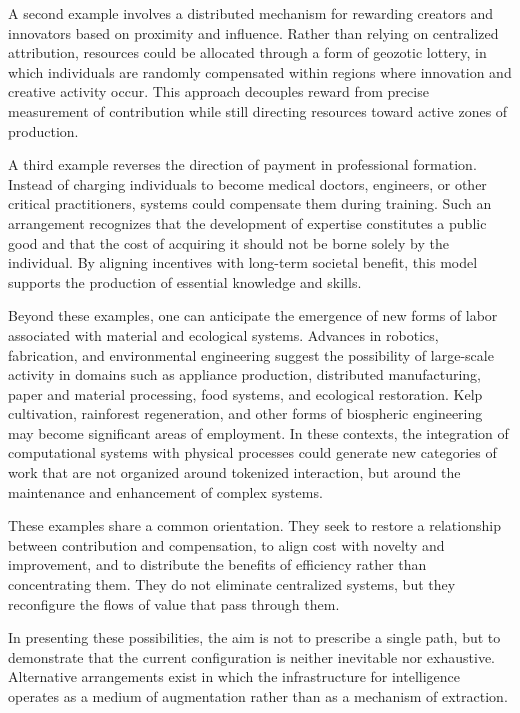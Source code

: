 \documentclass[12pt, oneside]{article}
\begin{document}
A second example involves a distributed mechanism for rewarding creators and innovators based on proximity and influence. Rather than relying on centralized attribution, resources could be allocated through a form of geozotic lottery, in which individuals are randomly compensated within regions where innovation and creative activity occur. This approach decouples reward from precise measurement of contribution while still directing resources toward active zones of production.

A third example reverses the direction of payment in professional formation. Instead of charging individuals to become medical doctors, engineers, or other critical practitioners, systems could compensate them during training. Such an arrangement recognizes that the development of expertise constitutes a public good and that the cost of acquiring it should not be borne solely by the individual. By aligning incentives with long-term societal benefit, this model supports the production of essential knowledge and skills.

Beyond these examples, one can anticipate the emergence of new forms of labor associated with material and ecological systems. Advances in robotics, fabrication, and environmental engineering suggest the possibility of large-scale activity in domains such as appliance production, distributed manufacturing, paper and material processing, food systems, and ecological restoration. Kelp cultivation, rainforest regeneration, and other forms of biospheric engineering may become significant areas of employment. In these contexts, the integration of computational systems with physical processes could generate new categories of work that are not organized around tokenized interaction, but around the maintenance and enhancement of complex systems.

These examples share a common orientation. They seek to restore a relationship between contribution and compensation, to align cost with novelty and improvement, and to distribute the benefits of efficiency rather than concentrating them. They do not eliminate centralized systems, but they reconfigure the flows of value that pass through them.

In presenting these possibilities, the aim is not to prescribe a single path, but to demonstrate that the current configuration is neither inevitable nor exhaustive. Alternative arrangements exist in which the infrastructure for intelligence operates as a medium of augmentation rather than as a mechanism of extraction.
\end{document}
